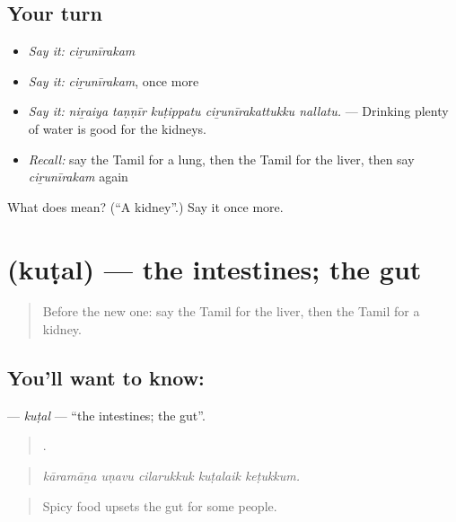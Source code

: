 \subsection*{Your turn}
\begin{itemize}
\raggedright
  \item \emph{Say it:} \emph{ciṟunīrakam}
  \item \emph{Say it:} \emph{ciṟunīrakam}, once more
  \item \emph{Say it:} \emph{niṟaiya taṇṇīr kuṭippatu ciṟunīrakattukku nallatu.} — Drinking plenty of water is good for the kidneys.
  \item \emph{Recall:} say the Tamil for a lung, then the Tamil for the liver, then say \emph{ciṟunīrakam} again
\end{itemize}

\begin{tcolorbox}[breakable,colback=teal!4,colframe=teal!35!black,title={Before you move on}]
What does  mean? (\textquotedblleft{}A kidney\textquotedblright{}.) Say it once more.
\end{tcolorbox}
\section[\texorpdfstring{\ta{குடல்} (kuṭal)}{குடல் (kuṭal)}]{ (kuṭal) — the intestines; the gut}

\label{lesson:TA-C478-kutal}



\begin{quote}
Before the new one: say the Tamil for the liver, then the Tamil for a kidney.
\end{quote}

\subsection*{You'll want to know: }
\textbf{} — \emph{kuṭal} — \textquotedblleft{}the intestines; the gut\textquotedblright{}.

\begin{quote}
    .
\end{quote}

\begin{quote}
\emph{kāramāṉa uṇavu cilarukkuk kuṭalaik keṭukkum.}
\end{quote}

\begin{quote}
Spicy food upsets the gut for some people.
\end{quote}

